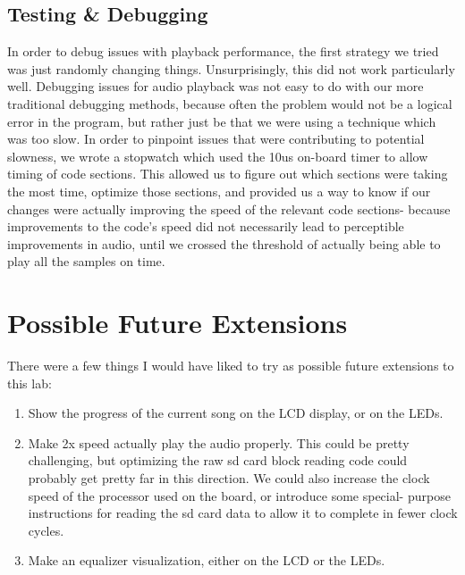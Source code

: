 \documentclass[12pt]{article}
\begin{document}
\subsection{Testing \& Debugging}
In order to debug issues with playback performance, the first strategy we
tried was just randomly changing things. Unsurprisingly, this did not work
particularly well. Debugging issues for audio playback was not easy to do
with our more traditional debugging methods, because often the problem would
not be a logical error in the program, but rather just be
that we were using a technique which was too slow. In order to pinpoint issues
that were contributing to potential slowness, we wrote a stopwatch which used
the 10us on-board timer to allow timing of code sections. This allowed us to
figure out which sections were taking the most time, optimize those sections,
and provided us a way to know if our changes were actually improving the speed
of the relevant code sections- because improvements to the code's speed did
not necessarily lead to perceptible improvements in audio, until we crossed
the threshold of actually being able to play all the samples on time.

\section{Possible Future Extensions}
There were a few things I would have liked to try as possible future extensions
to this lab:
\begin{enumerate}
\item Show the progress of the current song on the LCD display, or on the LEDs.
\item Make 2x speed actually play the audio properly. This could be pretty
	challenging, but optimizing the raw sd card block reading code could
	probably get pretty far in this direction. We could also increase the
	clock speed of the processor used on the board, or introduce some special-
	purpose instructions for reading the sd card data to allow it to complete
	in fewer clock cycles.
\item Make an equalizer visualization, either on the LCD or the LEDs.
\end{enumerate}
\end{document}
